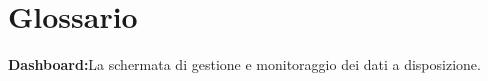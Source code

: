 \section{Glossario}
\textbf{Dashboard:}La schermata di gestione e monitoraggio dei dati a disposizione.